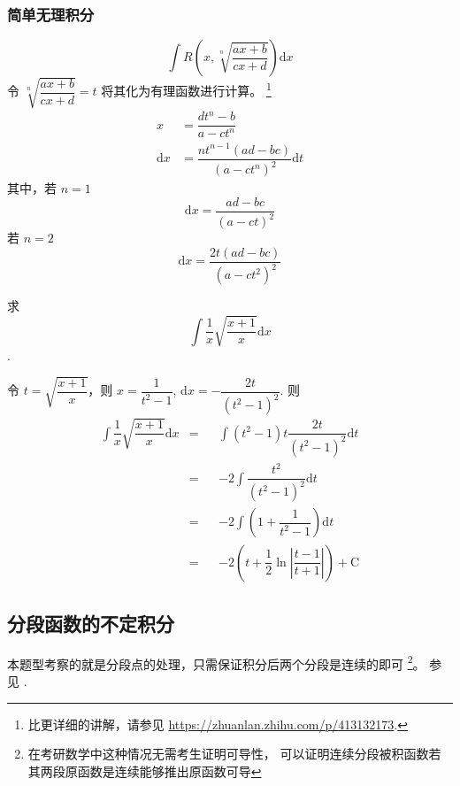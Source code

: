 \subsubsection{简单无理积分} \label{simple-irrational-integral}

\begin{equation}
    \int R\left(x, \sqrt[n]{\dfrac{ax+b}{cx+d}}\right) \mathrm{d} x
\end{equation}
令 $\sqrt[n]{\dfrac{ax+b}{cx+d}}=t$ 将其化为有理函数进行计算。
\footnote{
    比\cite{we}更详细的讲解，请参见
    \url{https://zhuanlan.zhihu.com/p/413132173}.
}
\begin{align*}
    x &= \dfrac{d t^n-b}{a-c t^n} \\
    \mathrm{d} x &= \dfrac{n t^{n-1} (a d-b c)}{\left(a-c t^n\right)^2} \mathrm{d} t
\end{align*}
其中，若 $n = 1$
\begin{equation}
    \mathrm{d} x = \dfrac{ad-bc}{(a-ct)^2}
\end{equation}
若 $n = 2$
\begin{equation}
    \mathrm{d} x = \dfrac{2t(ad-bc)}{(a-ct^2)^2}
\end{equation}

\begin{example}
    求
    \[
        \int \dfrac{1}{x} \sqrt{\dfrac{x+1}{x}} \mathrm{d} x
    \].

    令 $t =\sqrt{\dfrac{x+1}{x}}$，则 $x = \dfrac{1}{t^2 - 1}$,
    $\mathrm{d}x = - \dfrac{2t}{(t^2 - 1)^2}$.
    则
    \begin{align*}
        \int \dfrac{1}{x} \sqrt{\dfrac{x+1}{x}} \mathrm{d} x 
        &=& 
        &\int (t^2 - 1) t \dfrac{2t}{(t^2-1)^2} \mathrm{d} t \\
        &=& 
        &-2 \int \dfrac{t^2}{(t^2-1)^2} \mathrm{d} t\\
        &=& 
        &-2 \int \left(1+\dfrac{1}{t^2-1}\right) \mathrm{d} t\\
        &=& 
        &-2\left(t + \dfrac{1}{2} \ln \left|\dfrac{t-1}{t+1}\right|\right) + \mathrm{C}
    \end{align*}
\end{example}

\subsection{分段函数的不定积分}

本题型考察的就是分段点的处理，只需保证积分后两个分段是连续的即可
\footnote{在考研数学中这种情况无需考生证明可导性，
可以证明连续分段被积函数若其两段原函数是连续能够推出原函数可导}。
参见 \cite[page 101, pdf 112, example 5]{we}.

